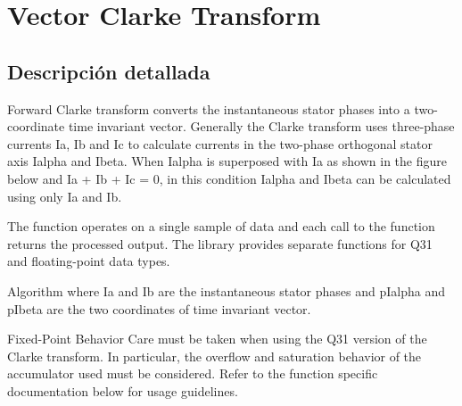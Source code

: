 \hypertarget{group__clarke}{}\section{Vector Clarke Transform}
\label{group__clarke}


\subsection{Descripción detallada}
Forward Clarke transform converts the instantaneous stator phases into a two-\/coordinate time invariant vector. Generally the Clarke transform uses three-\/phase currents {\ttfamily Ia, Ib and Ic} to calculate currents in the two-\/phase orthogonal stator axis {\ttfamily Ialpha} and {\ttfamily Ibeta}. When {\ttfamily Ialpha} is superposed with {\ttfamily Ia} as shown in the figure below  and {\ttfamily Ia + Ib + Ic = 0}, in this condition {\ttfamily Ialpha} and {\ttfamily Ibeta} can be calculated using only {\ttfamily Ia} and {\ttfamily Ib}.

The function operates on a single sample of data and each call to the function returns the processed output. The library provides separate functions for Q31 and floating-\/point data types. \begin{DoxyParagraph}{Algorithm}
 where {\ttfamily Ia} and {\ttfamily Ib} are the instantaneous stator phases and {\ttfamily p\+Ialpha} and {\ttfamily p\+Ibeta} are the two coordinates of time invariant vector. 
\end{DoxyParagraph}
\begin{DoxyParagraph}{Fixed-\/\+Point Behavior}
Care must be taken when using the Q31 version of the Clarke transform. In particular, the overflow and saturation behavior of the accumulator used must be considered. Refer to the function specific documentation below for usage guidelines. 
\end{DoxyParagraph}
